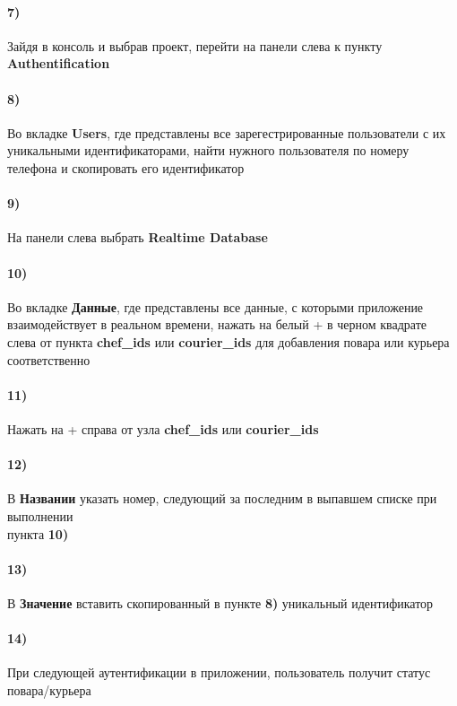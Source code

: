 \documentclass{article}
\begin{document}
  \paragraph{7)}
   {
        Зайдя в консоль и выбрав проект, перейти на панели слева к пункту \textbf{Authentification}
   }
  \paragraph{8)}
   {
        Во вкладке \textbf{Users}, где представлены все зарегестрированные пользователи с их уникальными идентификаторами, найти нужного пользователя по номеру телефона и скопировать его идентификатор
   }
   \paragraph{9)}
   {
        На панели слева выбрать \textbf{Realtime Database}
   }
   \paragraph{10)}
   {
        Во вкладке \textbf{Данные}, где представлены все данные, с которыми приложение взаимодействует в реальном времени, нажать на белый + в черном квадрате слева от пункта \textbf{chef\_ids} или \textbf{courier\_ids} для добавления повара или курьера соответственно
   }
   \paragraph{11)}
   {
        Нажать на + справа от узла \textbf{chef\_ids} или \textbf{courier\_ids}
   }

   \paragraph{12)}
   {
        В \textbf{Названии} указать номер, следующий за последним в выпавшем списке при выполнении \\ пункта \textbf{10)}
   }

   \paragraph{13)}
   {
        В \textbf{Значение} вставить скопированный в пункте \textbf{8)} уникальный идентификатор
   }

   \paragraph{14)}
   {
        При следующей аутентификации в приложении, пользователь получит статус повара/курьера
   }
\end{document}
